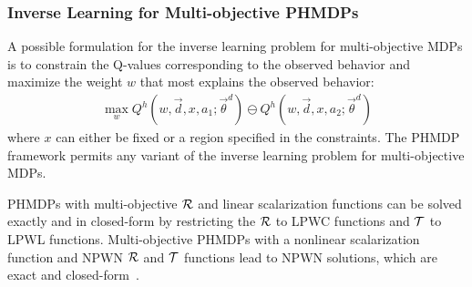 
\subsubsection{Inverse Learning for Multi-objective PHMDPs}

A possible formulation for the inverse learning problem for multi-objective MDPs is to 
constrain the Q-values corresponding to the observed behavior and maximize the weight {\footnotesize $ w $} that most explains the observed behavior: 
\begin{align}
    \max_w Q^{h} \left(w, \vec{d}, x, a_1; \vec{\theta}^d \right) \ominus Q^{h} \left(w, \vec{d}, x, a_2; \vec{\theta}^d \right)
\end{align}
where {\footnotesize $ x $} can either be fixed or a region specified in the constraints. The PHMDP framework permits any variant of the inverse learning problem for multi-objective MDPs.

PHMDPs with multi-objective {\footnotesize $\mathcal{R}$} and linear scalarization functions can be solved exactly and in closed-form by restricting the {\footnotesize $\mathcal{R}$} to LPWC functions and {\footnotesize $\mathcal{T}$} to LPWL functions. 
Multi-objective PHMDPs with a nonlinear scalarization function and NPWN {\footnotesize $\mathcal{R}$} and {\footnotesize $\mathcal{T}$} functions lead to NPWN solutions, which are exact and closed-form~\parencite{Sanner_UAI_2011}.


